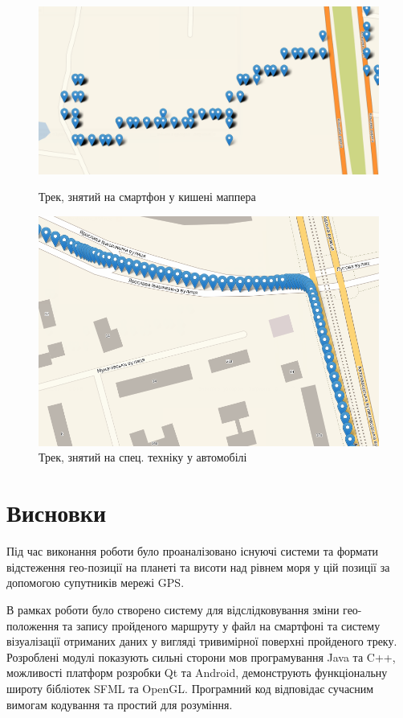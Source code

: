 \documentclass[simple,a4paper,14pt,ukrainian,utf8]{eskdtext}
\begin{document}
		\begin{figure}
			\centering \includegraphics[scale=0.35]{images/comparison_01.png}
			\caption{Трек, знятий на смартфон у кишені маппера}
			\vspace{2em}
			\centering \includegraphics[scale=0.5]{images/comparison_02.png}
			\caption{Трек, знятий на спец. техніку у автомобілі}
		\end{figure}

  \clearpage \newpage
  
  \section*{Висновки}

    Під час виконання роботи було проаналізовано існуючі системи та формати відстеження гео-позиції на планеті та висоти над рівнем моря у цій позиції за допомогою супутників мережі GPS.

    В рамках роботи було створено систему для відслідковування зміни гео-положення та запису пройденого маршруту у файл на смартфоні та систему візуалізації отриманих даних у вигляді тривимірної поверхні пройденого треку. Розроблені модулі показують сильні сторони мов програмування Java та C++, можливості платформ розробки Qt та Android, демонструють функціональну широту бібліотек SFML та OpenGL. Програмний код відповідає сучасним вимогам кодування та простий для розуміння.
\end{document}
